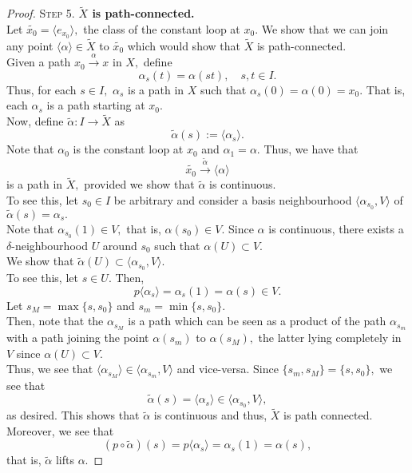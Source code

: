 \documentclass[12pt]{article}
\theoremstyle{definition}
\numberwithin{thm}{section}
\begin{document}
\begin{proof}
\textsc{Step 5.} \textbf{$\tilde{X}$ is path-connected.}\\
Let $\widetilde{x_0} = \langle e_{x_0}\rangle,$ the class of the constant loop at $x_0.$ We show that we can join any point $\langle \alpha\rangle \in \tilde{X}$ to $\widetilde{x_0}$ which would show that $\tilde{X}$ is path-connected.\\
Given a path $x_0 \overset{\alpha}{\longrightarrow} x$ in $X,$ define
\begin{equation*} 
	\alpha_s(t) = \alpha(st), \quad s, t \in I.
\end{equation*}
Thus, for each $s \in I,$ $\alpha_s$ is a path in $X$ such that $\alpha_s(0) = \alpha(0) = x_0.$ That is, each $\alpha_s$ is a path starting at $x_0.$\\
Now, define $\tilde{\alpha}:I \to \tilde{X}$ as 
\begin{equation*} 
	\tilde{\alpha}(s) := \langle \alpha_s\rangle.
\end{equation*}
Note that $\alpha_0$ is the constant loop at $x_0$ and $\alpha_1 = \alpha.$ Thus, we have that 
\begin{equation*} 
	\widetilde{x_0} \overset{\tilde{\alpha}}{\longrightarrow} \langle \alpha\rangle
\end{equation*}
is a path in $\tilde{X},$ provided we show that $\tilde{\alpha}$ is continuous.\\
To see this, let $s_0 \in I$ be arbitrary and consider a basis neighbourhood $\langle \alpha_{s_0}, V\rangle$ of $\tilde{\alpha}(s) = \alpha_s.$\\
Note that $\alpha_{s_0}(1) \in V,$ that is, $\alpha(s_0) \in V.$ Since $\alpha$ is continuous, there exists a $\delta$-neighbourhood $U$ around $s_0$ such that $\alpha(U) \subset V.$\\
We show that $\tilde{\alpha}(U) \subset \langle \alpha_{s_0}, V\rangle.$\\
To see this, let $s \in U.$ Then,
\begin{equation*} 
	p\langle \alpha_s\rangle = \alpha_s(1) = \alpha(s) \in V.
\end{equation*}
Let $s_M = \max\{s, s_0\}$ and $s_m = \min\{s, s_0\}.$ \\
Then, note that the $\alpha_{s_M}$ is a path which can be seen as a product of the path $\alpha_{s_m}$ with a path joining the point $\alpha(s_m)$ to $\alpha(s_M),$ the latter lying completely in $V$ since $\alpha(U) \subset V.$\\
Thus, we see that $\langle \alpha_{s_M}\rangle \in \langle \alpha_{s_m}, V\rangle$ and vice-versa. Since $\{s_m, s_M\} = \{s, s_0\},$ we see that
\begin{equation*} 
	\tilde{\alpha}(s) = \langle \alpha_s\rangle \in \langle \alpha_{s_0}, V\rangle,
\end{equation*}
as desired. This shows that $\tilde{\alpha}$ is continuous and thus, $\tilde{X}$ is path connected.\\
Moreover, we see that
\begin{equation*} 
	(p\circ\tilde{\alpha})(s) = p\langle \alpha_s\rangle = \alpha_s(1) = \alpha(s),
\end{equation*}
that is, $\tilde{\alpha}$ lifts $\alpha.$ 


\end{proof}
\end{document}

